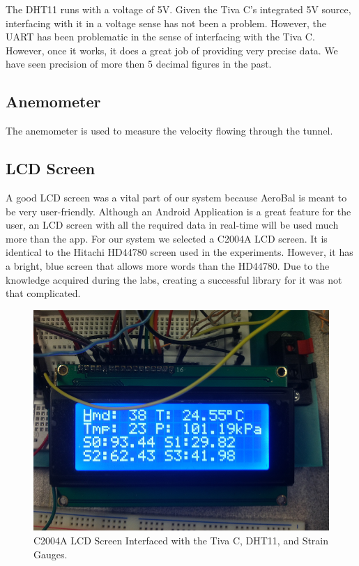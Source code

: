 		The DHT11 runs with a voltage of 5V. Given the Tiva C's integrated 5V source, interfacing with it in a voltage sense has not been a problem. However, the UART has been problematic in the sense of interfacing with the Tiva C. However, once it works, it does a great job of providing very precise data. We have seen precision of more then 5 decimal figures in the past.  
		
		\subsection{Anemometer}
		
		The anemometer is used to measure the velocity flowing through the tunnel. 
		
		\subsection{LCD Screen}
		
		A good LCD screen was a vital part of our system because AeroBal is meant to be very user-friendly. Although an Android Application is a great feature for the user, an LCD screen with all the required data in real-time will be used much more than the app. For our system we selected a C2004A LCD screen. 
		It is identical to the Hitachi HD44780 screen used in the experiments. However, it has a bright, blue screen that allows more words than the HD44780. Due to the knowledge acquired during the labs, creating a successful library for it was not that complicated. 
		
		\begin{figure}[H]
			\centering
				\includegraphics[scale=0.1]{img/LCD}
			\caption{C2004A LCD Screen Interfaced with the Tiva C, DHT11, and Strain Gauges.}
		\end{figure}
		
